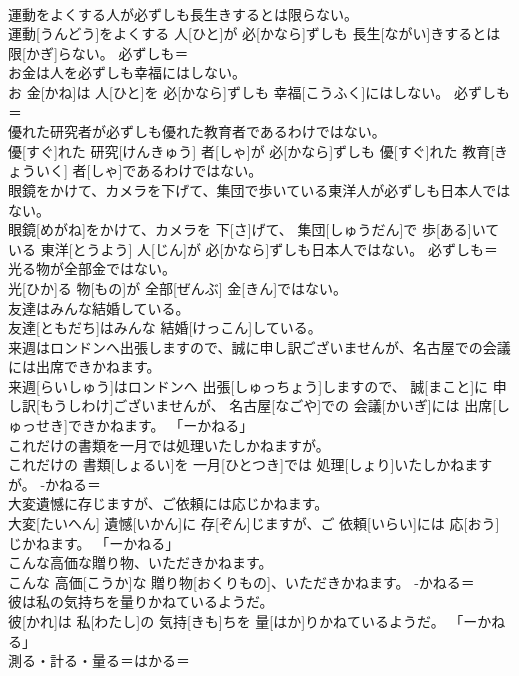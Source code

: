 \documentclass[8pt]{extreport}
\begin{document}
\begin{CJK}{UTF8}{min}
\\	運動をよくする人が必ずしも長生きするとは限らない。	
\\	運動[うんどう]をよくする 人[ひと]が 必[かなら]ずしも 長生[ながい]きするとは 限[かぎ]らない。	必ずしも＝ 
\\	お金は人を必ずしも幸福にはしない。	
\\	お 金[かね]は 人[ひと]を 必[かなら]ずしも 幸福[こうふく]にはしない。	必ずしも＝ 
\\	優れた研究者が必ずしも優れた教育者であるわけではない。	
\\	優[すぐ]れた 研究[けんきゅう] 者[しゃ]が 必[かなら]ずしも 優[すぐ]れた 教育[きょういく] 者[しゃ]であるわけではない。	
\\	眼鏡をかけて、カメラを下げて、集団で歩いている東洋人が必ずしも日本人ではない。	
\\	眼鏡[めがね]をかけて、カメラを 下[さ]げて、 集団[しゅうだん]で 歩[ある]いている 東洋[とうよう] 人[じん]が 必[かなら]ずしも日本人ではない。	必ずしも＝ 
\\	光る物が全部金ではない。	
\\	光[ひか]る 物[もの]が 全部[ぜんぶ] 金[きん]ではない。	
\\	友達はみんな結婚している。	
\\	友達[ともだち]はみんな 結婚[けっこん]している。	
\\	来週はロンドンへ出張しますので、誠に申し訳ございませんが、名古屋での会議には出席できかねます。	
\\	来週[らいしゅう]はロンドンへ 出張[しゅっちょう]しますので、 誠[まこと]に 申し訳[もうしわけ]ございませんが、 名古屋[なごや]での 会議[かいぎ]には 出席[しゅっせき]できかねます。	「ーかねる」
\\	これだけの書類を一月では処理いたしかねますが。	
\\	これだけの 書類[しょるい]を 一月[ひとつき]では 処理[しょり]いたしかねますが。	-かねる＝ 
\\	大変遺憾に存じますが、ご依頼には応じかねます。	
\\	大変[たいへん] 遺憾[いかん]に 存[ぞん]じますが、ご 依頼[いらい]には 応[おう]じかねます。	「ーかねる」
\\	こんな高価な贈り物、いただきかねます。	
\\	こんな 高価[こうか]な 贈り物[おくりもの]、いただきかねます。	-かねる＝ 
\\	彼は私の気持ちを量りかねているようだ。	
\\	彼[かれ]は 私[わたし]の 気持[きも]ちを 量[はか]りかねているようだ。	「ーかねる」
\\	測る・計る・量る＝はかる＝ 

\end{CJK}
\end{document}
